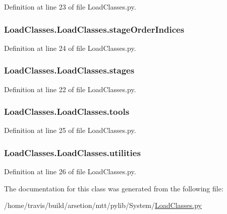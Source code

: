Definition at line 23 of file Load\-Classes.\-py.

\hypertarget{classLoadClasses_1_1LoadClasses_adb9a18af5fe6814c0c46e8c51f9682ef}{
\subsubsection[{stage\-Order\-Indices}]{\setlength{\rightskip}{0pt plus 5cm}Load\-Classes.\-Load\-Classes.\-stage\-Order\-Indices}}\label{classLoadClasses_1_1LoadClasses_adb9a18af5fe6814c0c46e8c51f9682ef}


Definition at line 24 of file Load\-Classes.\-py.

\hypertarget{classLoadClasses_1_1LoadClasses_aca4663cc6002ec1139e8b07f15aa1006}{
\subsubsection[{stages}]{\setlength{\rightskip}{0pt plus 5cm}Load\-Classes.\-Load\-Classes.\-stages}}\label{classLoadClasses_1_1LoadClasses_aca4663cc6002ec1139e8b07f15aa1006}


Definition at line 22 of file Load\-Classes.\-py.

\hypertarget{classLoadClasses_1_1LoadClasses_acea1357ee5b059c0c010c62d9dcdfd42}{
\subsubsection[{tools}]{\setlength{\rightskip}{0pt plus 5cm}Load\-Classes.\-Load\-Classes.\-tools}}\label{classLoadClasses_1_1LoadClasses_acea1357ee5b059c0c010c62d9dcdfd42}


Definition at line 25 of file Load\-Classes.\-py.

\hypertarget{classLoadClasses_1_1LoadClasses_a9bc5a2e86aee8dffd444ea68bc9258de}{
\subsubsection[{utilities}]{\setlength{\rightskip}{0pt plus 5cm}Load\-Classes.\-Load\-Classes.\-utilities}}\label{classLoadClasses_1_1LoadClasses_a9bc5a2e86aee8dffd444ea68bc9258de}


Definition at line 26 of file Load\-Classes.\-py.



The documentation for this class was generated from the following file\-:\begin{DoxyCompactItemize}
\item 
/home/travis/build/arsetion/mtt/pylib/\-System/\hyperlink{LoadClasses_8py}{Load\-Classes.\-py}\end{DoxyCompactItemize}
